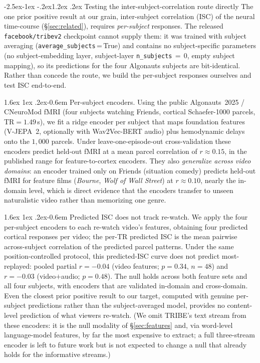 \documentclass[11pt]{article}
\makeatletter
\renewcommand\subsection{\@startsection{subsection}{2}{\z@}%
  {-2.5ex\@plus -1ex \@minus -.2ex}{1.2ex \@plus .2ex}%
  {\normalfont\normalsize\sffamily\bfseries}}
\renewcommand\paragraph{\@startsection{paragraph}{4}{\z@}%
  {1.6ex \@plus1ex \@minus.2ex}{-0.6em}%
  {\normalfont\normalsize\sffamily\bfseries}}
\makeatother
\begin{document}
\subsection{Testing the inter-subject-correlation route directly}\label{sec:isc}
The one prior positive result at our grain, inter-subject correlation (ISC) of the neural
time-course (\S\ref{sec:related}), requires \emph{per-subject} responses. The released
\texttt{facebook/tribev2} checkpoint cannot supply them: it was trained with subject averaging
(\texttt{average\_subjects}\,=\,True) and contains no subject-specific parameters (no
subject-embedding layer, subject-layer \texttt{n\_subjects}\,$=$\,$0$, empty subject mapping), so its
predictions for the four Algonauts subjects are bit-identical. Rather than concede the route, we
build the per-subject responses ourselves and test ISC end-to-end.

\paragraph{Per-subject encoders.} Using the public Algonauts~2025 / CNeuroMod fMRI (four subjects
watching Friends, cortical Schaefer-1000 parcels, TR${=}1.49$\,s), we fit a ridge encoder per subject
that maps foundation features (V-JEPA~2, optionally with Wav2Vec-BERT audio) plus hemodynamic delays
onto the $1{,}000$ parcels. Under leave-one-episode-out cross-validation these encoders predict
held-out fMRI at a mean parcel correlation of $r\approx0.15$, in the published range for
feature-to-cortex encoders. They also \emph{generalize across video domains}: an encoder trained only
on Friends (situation comedy) predicts held-out fMRI for feature films (\emph{Bourne}, \emph{Wolf of
Wall Street}) at $r\approx0.10$, nearly the in-domain level, which is direct evidence that the
encoders transfer to unseen naturalistic video rather than memorizing one genre.

\paragraph{Predicted ISC does not track re-watch.} We apply the four per-subject encoders to each
re-watch video's features, obtaining four predicted cortical responses per video; the per-TR
predicted ISC is the mean pairwise across-subject correlation of the predicted parcel patterns. Under
the same position-controlled protocol, this predicted-ISC curve does not predict most-replayed:
pooled partial $r=-0.04$ (video features; $p=0.34$, $n=48$) and $r=-0.03$ (video${+}$audio;
$p=0.48$). The null holds across both feature sets and all four subjects, with encoders that are
validated in-domain and cross-domain. Even the closest prior positive result to our target, computed
with genuine per-subject predictions rather than the subject-averaged model, provides no
content-level prediction of what viewers re-watch. (We omit TRIBE's text stream from these encoders:
it is the null modality of \S\ref{sec:features} and, via word-level language-model features, by far
the most expensive to extract; a full three-stream encoder is left to future work but is not expected
to change a null that already holds for the informative streams.)
\end{document}
